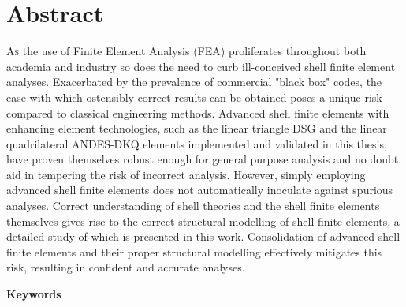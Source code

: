 
\chapter*{Abstract}
\label{cha:abstract}
\lettrine[lines=2]{A}{s} the use of Finite Element Analysis (FEA) proliferates throughout both academia and industry so does the need to curb ill-conceived shell finite element analyses. Exacerbated by the prevalence of commercial "black box" codes, the ease with which ostensibly correct results can be obtained poses a unique risk compared to classical engineering methods. Advanced shell finite elements with enhancing element technologies, such as the linear triangle DSG and the linear quadrilateral ANDES-DKQ elements implemented and validated in this thesis, have proven themselves robust enough for general purpose analysis and no doubt aid in tempering the risk of incorrect analysis. However, simply employing advanced shell finite elements does not automatically inoculate against spurious analyses. Correct understanding of shell theories and the shell finite elements themselves gives rise to the correct structural modelling of shell finite elements, a detailed study of which is presented in this work. Consolidation of advanced shell finite elements and their proper structural modelling effectively mitigates this risk, resulting in confident and accurate analyses.

\vspace*{10mm}

{\textcolor{gray75}{\Huge\bfseries{Keywords}}}

\vspace*{8mm}

\keywords

\newpage